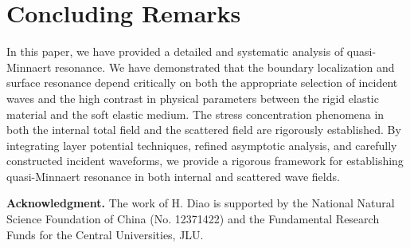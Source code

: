\documentclass[11pt,reqno,twoside]{amsart}
\theoremstyle{definition}
\theoremstyle{remark}
\numberwithin{equation}{section}
\begin{document}
\section*{Concluding Remarks} 
\label{sec:conclusions}

In this paper, we have provided a detailed and systematic analysis of quasi-Minnaert resonance. We have demonstrated that the boundary localization and surface resonance depend critically on both the appropriate selection of incident waves and the high contrast in physical parameters between the rigid elastic material and the soft elastic medium. The stress concentration phenomena in both the internal total field and the scattered field  are rigorously established.  By integrating layer potential techniques, refined asymptotic analysis, and carefully constructed incident waveforms, we provide a rigorous framework for establishing quasi-Minnaert resonance in both internal and scattered wave fields.


\bigskip

\noindent\textbf{Acknowledgment.}
The work of H. Diao is supported by the National Natural Science Foundation of China  (No. 12371422) and the Fundamental Research Funds for the Central Universities, JLU.

\medskip



\end{document}
